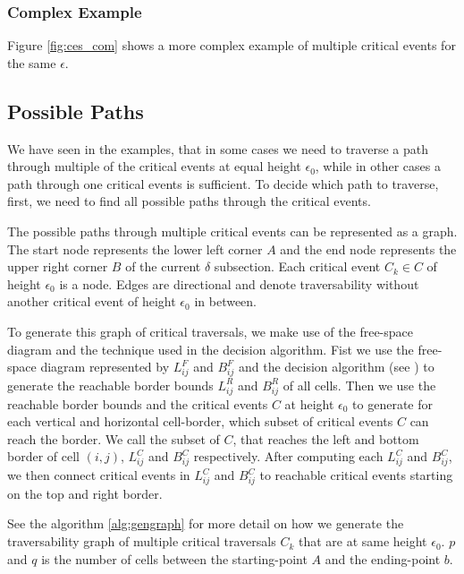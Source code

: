 \subsubsection{Complex Example}

Figure \ref{fig:ces_com} shows a more complex example of multiple critical events for the same $\epsilon$. 






\subsection{Possible Paths}

We have seen in the examples, that in some cases we need to traverse a path through multiple of the critical events at equal height $\epsilon_0$, while in other cases a path through one critical events is sufficient. To decide which path to traverse, first, we need to find all possible paths through the critical events.

The possible paths through multiple critical events can be represented as a graph. The start node represents the lower left corner $A$ and the end node represents the upper right corner $B$ of the current $\delta$ subsection. Each critical event $C_k \in C$ of height $\epsilon_0$ is a node. Edges are directional and denote traversability without another critical event of height $\epsilon_0$ in between.

To generate this graph of critical traversals, we make use of the free-space diagram and the technique used in the decision algorithm. Fist we use the free-space diagram represented by $L_{ij}^F$ and $B_{ij}^F$ and the decision algorithm (see \citet{altgodau}) to generate the reachable border bounds $L_{ij}^R$ and $B_{ij}^R$ of all cells. Then we use the reachable border bounds and the critical events $C$ at height $\epsilon_0$ to generate for each vertical and horizontal cell-border, which subset of critical events $C$ can reach the border. We call the subset of $C$, that reaches the left and bottom border of cell $(i,j)$, $L_{ij}^C$ and $B_{ij}^C$ respectively. After computing each $L_{ij}^C$ and $B_{ij}^C$, we then connect critical events in $L_{ij}^C$ and $B_{ij}^C$ to reachable critical events starting on the top and right border.

See the algorithm \ref{alg:gengraph} for more detail on how we generate the traversability graph of multiple critical traversals $C_k$ that are at same height $\epsilon_0$. $p$ and $q$ is the number of cells between the starting-point $A$ and the ending-point $b$.


